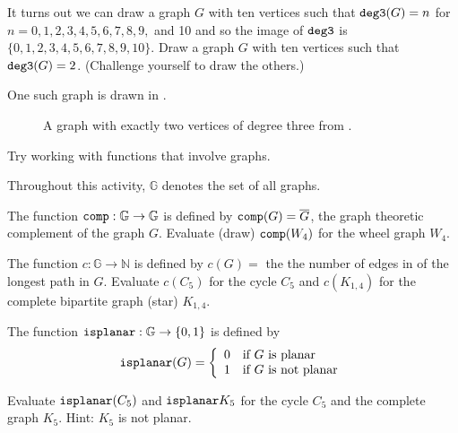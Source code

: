 \begin{exam}
\begin{apart}
            \item It turns out we can draw a graph $G$ with ten vertices such that $\texttt{deg3}(G) = n$ for $n=0,1,2,3,4,5,6,7,8,9,$ and 10 and so the image of $\texttt{deg3}$ is $\{0,1,2,3,4,5,6,7,8,9,10\}$.  Draw a graph $G$ with ten vertices such that $\texttt{deg3}(G) = 2$. (Challenge yourself to draw the others.)
                \begin{soln}
                    One such graph is drawn in .
                        \begin{figure}[hb]
                            \centering
                            
                            \caption{A graph with exactly two vertices of degree three from .}
                            \label{fig_two_deg3}
                        \end{figure}
                \end{soln}
         \end{apart}
\end{exam}

Try working with functions that involve graphs.

\begin{act}
\label{act_graph_theoretic_functions}
    Throughout this activity, $\mathbb{G}$ denotes the set of all graphs.
        \begin{actpart}
            \item The function $\texttt{comp}: \mathbb{G} \to \mathbb{G}$ is defined by $\texttt{comp}(G)=\overline{G}$, the graph theoretic complement of the graph $G$. Evaluate (draw) $\texttt{comp}(W_4)$ for the wheel graph $W_4$.
            \item The function $c: \mathbb{G} \to \mathbb{N}$ is defined by $c(G)=$ the the number of edges in of the longest path in $G$. Evaluate $c(C_5)$ for the cycle $C_5$ and $c(K_{1,4})$ for the complete bipartite graph (star) $K_{1,4}$.
            \item The function $\texttt{isplanar}: \mathbb{G} \to \{0,1\}$ is defined by 
                $$\texttt{isplanar}(G) 
                = \left\{ \begin{array} {cl} 
                0 & \text{if }G\text{ is planar} \\
                1 & \text{if }G\text{ is not planar} \\
                \end{array} \right.$$
            \item Evaluate $\texttt{isplanar}(C_5)$ and $\texttt{isplanar}{K_5}$ for the cycle $C_5$ and the complete graph $K_5$.  Hint: $K_5$ is not planar.
        \end{actpart}
\end{act}

